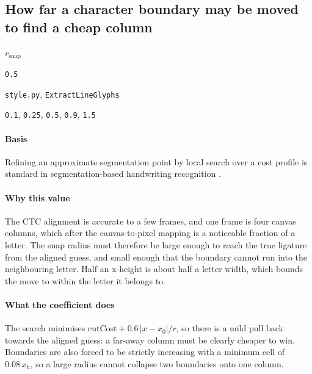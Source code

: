 \subsection{How far a character boundary may be moved to find a cheap column}

\label{coef:snap-radius}

\begin{description}[leftmargin=5.2em,style=sameline]

\item[Symbol] $r_{\text{snap}}$

\item[Value] \texttt{0.5}

\item[Source] \texttt{style.py}, \texttt{ExtractLineGlyphs}

\item[Swept] \texttt{0.1}, \texttt{0.25}, \texttt{0.5}, \texttt{0.9}, \texttt{1.5}

\end{description}

\paragraph{Basis}

Refining an approximate segmentation point by local search over a cost profile is standard in segmentation-based handwriting recognition \cite{likforman2007}.

\paragraph{Why this value}

The CTC alignment is accurate to a few frames, and one frame is four canvas columns, which after the canvas-to-pixel mapping is a noticeable fraction of a letter. The snap radius must therefore be large enough to reach the true ligature from the aligned guess, and small enough that the boundary cannot run into the neighbouring letter. Half an x-height is about half a letter width, which bounds the move to within the letter it belongs to.

\paragraph{What the coefficient does}

The search minimises $\text{cutCost} + 0.6\,|x-x_0|/r$, so there is a mild pull back towards the aligned guess: a far-away column must be clearly cheaper to win. Boundaries are also forced to be strictly increasing with a minimum cell of $0.08\,x_h$, so a large radius cannot collapse two boundaries onto one column.

